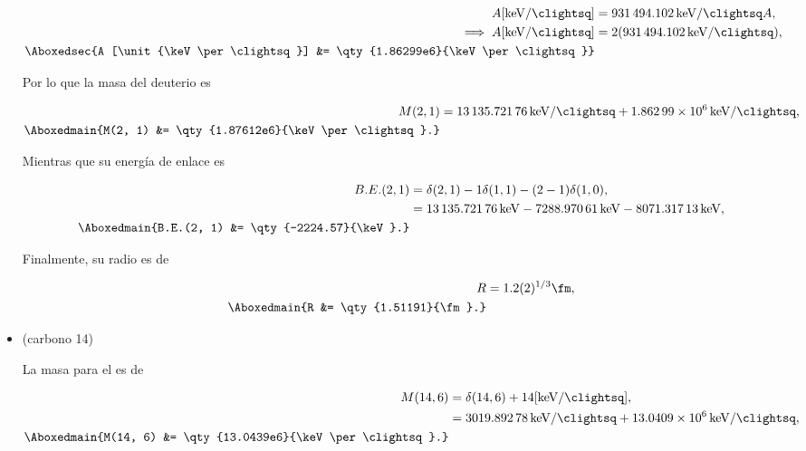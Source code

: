 \documentclass[./../main.tex]{subfiles}
\begin{document}
\begin{exercise}
\begin{solution}
\begin{itemize}
                    \begin{align*}
                        A [\unit{\keV\per\clightsq}] &= \qty{931494.102}{\keV\per\clightsq} A,\\
                        \implies A [\unit{\keV\per\clightsq}] &= 2(\qty{931494.102}{\keV\per\clightsq}),\\
                        \Aboxedsec{A [\unit{\keV\per\clightsq}] &= \qty{1.86299e6}{\keV\per\clightsq}}
                    \end{align*}

                    Por lo que la masa del deuterio es

                    \begin{align*}
                        M(2, 1) &= \qty{13135.72176}{\keV\per\clightsq} + \qty{1.86299e6}{\keV\per\clightsq},\\
                        \Aboxedmain{M(2, 1) &= \qty{1.87612e6}{\keV\per\clightsq}.}
                    \end{align*}

                    Mientras que su energía de enlace es

                    \begin{align*}
                        B.E.(2, 1) &= \delta(2, 1) - 1\delta(1, 1) - (2 - 1)\delta(1, 0),\\
                        &= \qty{13135.72176}{\keV} - \qty{7288.97061}{\keV} - \qty{8071.31713}{\keV},\\
                        \Aboxedmain{B.E.(2, 1) &= \qty{-2224.57}{\keV}.}
                    \end{align*}

                    Finalmente, su radio es de

                    \begin{align*}
                        R &= 1.2 (2)^{1/3}\unit{\fm},\\
                        \Aboxedmain{R &= \qty{1.51191}{\fm}.}
                    \end{align*}

			\item {} (carbono 14)
			
				La masa para el  es de

				\begin{align*}
					M(14, 6) &= \delta(14, 6) + 14 [\unit{\keV\per\clightsq}],\\
					&= \qty{3019.89278}{\keV\per\clightsq} + \qty{13.0409e6}{\keV\per\clightsq},\\
					\Aboxedmain{M(14, 6) &= \qty{13.0439e6}{\keV\per\clightsq}.}
				\end{align*}


\end{itemize}
\end{solution}
\end{exercise}
\end{document}
